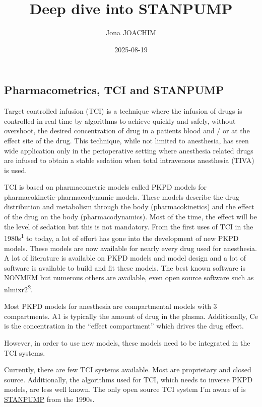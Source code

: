 \documentclass[
  letterpaper,
  DIV=11,
  numbers=noendperiod]{scrartcl}
\title{Deep dive into STANPUMP}
\author{Jona JOACHIM}
\date{2025-08-19}
\begin{document}
\maketitle


\subsection{Pharmacometrics, TCI and
STANPUMP}\label{pharmacometrics-tci-and-stanpump}

Target controlled infusion (TCI) is a technique where the infusion of
drugs is controlled in real time by algorithms to achieve quickly and
safely, without overshoot, the desired concentration of drug in a
patients blood and / or at the effect site of the drug. This technique,
while not limited to anesthesia, has seen wide application only in the
perioperative setting where anesthesia related drugs are infused to
obtain a stable sedation when total intravenous anesthesia (TIVA) is
used.

TCI is based on pharmacometric models called PKPD models for
pharmacokinetic-pharmacodynamic models. These models describe the drug
distribution and metabolism through the body (pharmacokinetics) and the
effect of the drug on the body (pharmacodynamics). Most of the time, the
effect will be the level of sedation but this is not mandatory. From the
first uses of TCI in the 1980s\textsuperscript{1} to today, a lot of
effort has gone into the development of new PKPD models. These models
are now available for nearly every drug used for anesthesia. A lot of
literature is available on PKPD models and model design and a lot of
software is available to build and fit these models. The best known
software is NONMEM but numerous others are available, even open source
software such as nlmixr2\textsuperscript{2}.

Most PKPD models for anesthesia are compartmental models with 3
compartments. A1 is typically the amount of drug in the plasma.
Additionally, Ce is the concentration in the ``effect compartment''
which drives the drug effect.

However, in order to use new models, these models need to be integrated
in the TCI systems.

Currently, there are few TCI systems available. Most are proprietary and
closed source. Additionally, the algorithms used for TCI, which needs to
inverse PKPD models, are less well known. The only open source TCI
system I'm aware of is
\href{https://opentci.org/code/stanpump}{STANPUMP} from the 1990s.
\end{document}
